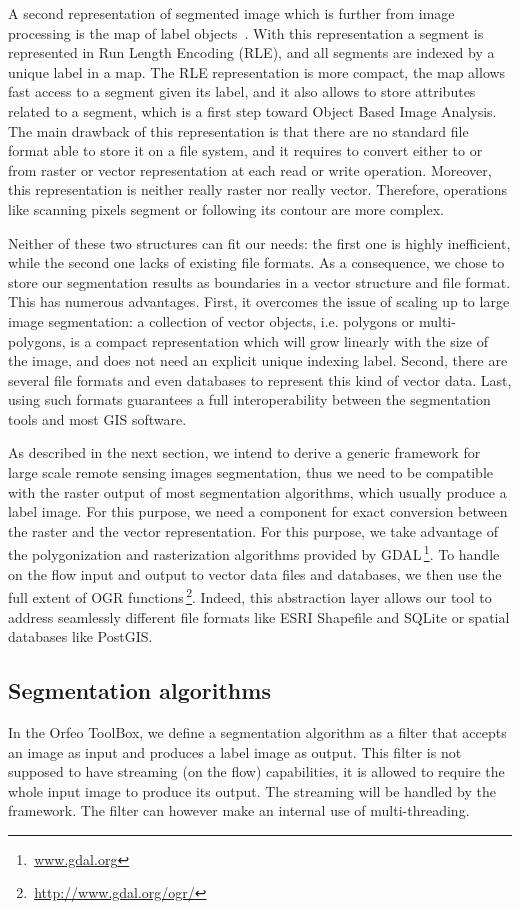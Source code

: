 \documentclass{josis}
\newcommand{\furl}[1]{$\,$\footnote{$\,$\url{#1}}}
\begin{document}
A second representation of segmented image which is further from image
processing is the map of label objects~\cite{lehmann2008label}. With this
representation a segment is represented in Run Length Encoding (RLE), and all
segments are indexed by a unique label in a map. The RLE representation is more
compact, the map allows fast access to a segment given its label, and it also
allows to store attributes related to a segment, which is a first step toward
Object Based Image Analysis. The main drawback of this representation is that
there are no standard file format able to store it on a file system, and it
requires to convert either to or from raster or vector representation at each
read or write operation. Moreover, this representation is neither really raster
nor really vector. Therefore, operations like scanning pixels segment or
following its contour are more complex.

Neither of these two structures can fit our needs: the first one is highly
inefficient, while the second one lacks of existing file formats. As a
consequence, we chose to store our segmentation results as boundaries in a
vector structure and file format. This has numerous advantages. First, it
overcomes the issue of scaling up to large image segmentation: a collection of
vector objects, i.e. polygons or multi-polygons, is a compact representation
which will grow linearly with the size of the image, and does not need an
explicit unique indexing label. Second, there are several file formats and even
databases to represent this kind of vector data. Last, using such formats
guarantees a full interoperability between the segmentation tools and most GIS
software.

As described in the next section, we intend to derive a generic framework for
large scale remote sensing images segmentation, thus we need to be compatible
with the raster output of most segmentation algorithms, which usually produce a
label image. For this purpose, we need a component for exact conversion between
the raster and the vector representation. For this purpose, we take advantage of
the polygonization and rasterization algorithms provided by
GDAL\furl{www.gdal.org}. To handle on the flow input and output to vector data
files and databases, we then use the full extent of OGR
functions\furl{http://www.gdal.org/ogr/}. Indeed, this abstraction layer allows
our tool to address seamlessly different file formats like ESRI Shapefile and
SQLite or spatial databases like PostGIS.

\subsection{Segmentation algorithms}
In the Orfeo ToolBox, we define a segmentation algorithm as a filter
that accepts an image as input and produces a label
image as output. This filter is not supposed to have streaming (on the
flow) capabilities, it is allowed to require the whole input image to
produce its output. The streaming will be handled by the
framework. The filter can however make an internal use of
multi-threading.
\end{document}
